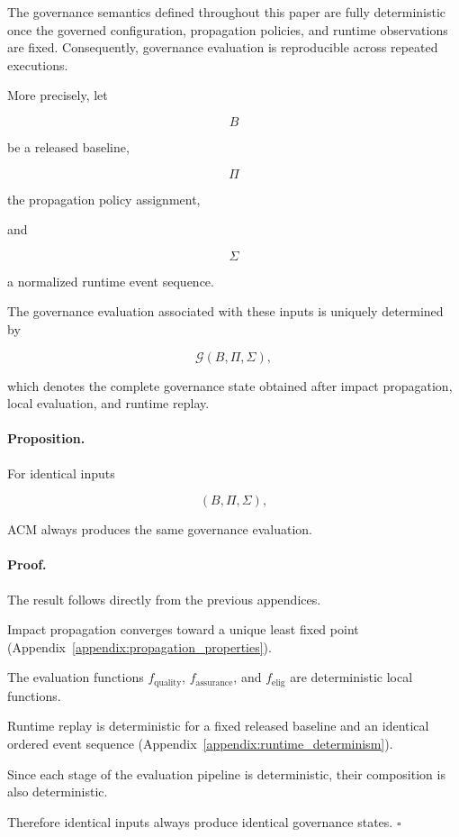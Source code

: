 \documentclass[10pt]{article}
\begin{document}
The governance semantics defined throughout this paper are fully deterministic
once the governed configuration, propagation policies, and runtime observations
are fixed. Consequently, governance evaluation is reproducible across repeated
executions.

More precisely, let

\[
B
\]

be a released baseline,

\[
\Pi
\]

the propagation policy assignment,

and

\[
\Sigma
\]

a normalized runtime event sequence.

The governance evaluation associated with these inputs is uniquely determined by

\[
\mathcal G(B,\Pi,\Sigma),
\]

which denotes the complete governance state obtained after impact propagation,
local evaluation, and runtime replay.

\paragraph*{Proposition.}

For identical inputs

\[
(B,\Pi,\Sigma),
\]

ACM always produces the same governance evaluation.

\paragraph*{Proof.}

The result follows directly from the previous appendices.

Impact propagation converges toward a unique least fixed point
(Appendix~\ref{appendix:propagation_properties}).

The evaluation functions
$f_{\mathrm{quality}}$,
$f_{\mathrm{assurance}}$,
and
$f_{\mathrm{elig}}$
are deterministic local functions.

Runtime replay is deterministic for a fixed released baseline and an identical
ordered event sequence
(Appendix~\ref{appendix:runtime_determinism}).

Since each stage of the evaluation pipeline is deterministic, their composition
is also deterministic.

Therefore identical inputs always produce identical governance states.
\hfill$\square$
\end{document}
